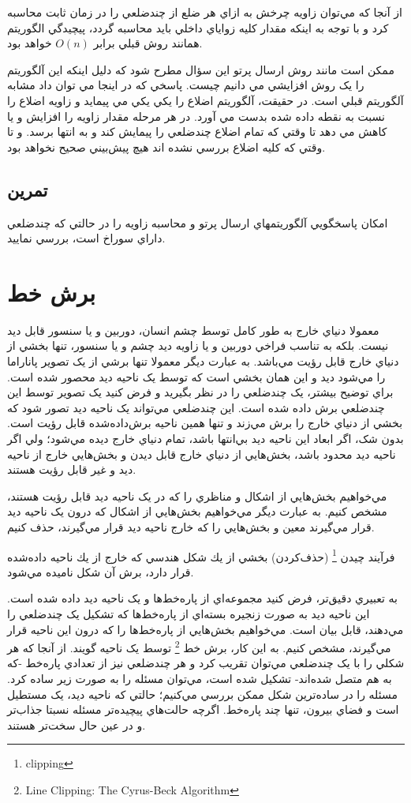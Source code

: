 \documentclass{book}
\begin{document}
از آنجا که مي‌توان زاويه چرخش به ازاي هر ضلع از چندضلعي را در زمان ثابت محاسبه کرد و با توجه به اينکه مقدار کليه زواياي داخلي بايد محاسبه گردد، پيچيدگي الگوريتم همانند روش قبلي برابر $O(n)$ خواهد بود.

ممکن است مانند روش ارسال پرتو اين سؤال مطرح شود که دليل اينکه اين آلگوريتم را يک روش افزايشي مي دانيم چيست. پاسخي که در اينجا مي توان داد مشابه آلگوريتم قبلي است. در حقيقت، آلگوريتم اضلاع را يکي يکي مي پيمايد و زاويه اضلاع را نسبت به نقطه داده شده بدست مي آورد. در هر مرحله مقدار زاويه را افزايش و يا کاهش مي دهد تا وقتي که تمام اضلاع چند‌ضلعي را پيمايش کند و به انتها برسد. و تا وقتي که کليه اضلاع بررسي نشده اند هيچ پيش‌بيني صحيح نخواهد بود.

\subsection{تمرين}

امکان پاسخگويي آلگوريتمهاي ارسال پرتو و محاسبه زاويه را در حالتي که چندضلعي داراي سوراخ است، بررسي نماييد.

\section{برش خط}

معمولا دنياي خارج به طور کامل توسط چشم انسان، دوربين و يا سنسور قابل ديد نيست. بلکه به تناسب فراخي دوربين و يا زاويه ديد چشم و يا سنسور، تنها بخشي از دنياي خارج قابل رؤيت مي‌باشد. به عبارت ديگر معمولا تنها برشي از يک تصوير پاناراما را مي‌شود ديد  و اين همان بخشي است که توسط يک ناحيه ديد محصور شده است. براي توضيح بيشتر،  يک چندضلعي را در نظر بگيريد و فرض کنيد يک تصوير توسط اين چندضلعي برش داده شده است. اين چندضلعي مي‌تواند يک ناحيه ديد تصور شود که بخشي از دنياي خارج را برش مي‌زند و تنها همين ناحيه برش‌داده‌شده قابل رؤيت است. بدون شک، اگر ابعاد اين ناحيه ديد بي‌انتها باشد، تمام دنياي خارج ديده مي‌شود؛ ولي اگر ناحيه ديد محدود باشد، بخش‌هايي از دنياي خارج قابل ديدن و بخش‌هايي خارج از ناحيه ديد و غير قابل رؤيت هستند.

مي‌خواهيم بخش‌هايي از اشکال و مناظري را که در يک ناحيه ديد قابل رؤيت هستند، مشخص کنيم. به عبارت ديگر مي‌خواهيم بخش‌هايي از اشکال که درون يک ناحيه ديد قرار مي‌گيرند معين و بخش‌هايي را که خارج ناحيه ديد قرار مي‌گيرند، حذف کنيم.

فرآيند چيدن \footnote{clipping}
(حذف‌كردن) بخشي از يك شکل هندسي كه خارج از يك ناحيه داده‌شده قرار دارد، برش آن شکل ناميده مي‌‌شود.

به تعبيري دقيق‌تر، فرض کنيد مجموعه‌اي از پاره‌خط‌ها و يک ناحيه ديد داده شده است. اين ناحيه ديد به‌ صورت زنجيره بسته‌اي از پاره‌خط‌ها که تشکيل يک چندضلعي را مي‌دهند، قابل بيان است. مي‌خواهيم بخش‌هايي از پاره‌خط‌ها را که درون اين ناحيه قرار مي‌گيرند، مشخص کنيم. به اين کار، برش خط \footnote{‌Line Clipping: The Cyrus-Beck Algorithm}
توسط يک ناحيه گويند.
از آنجا که هر شکلي را با يک چندضلعي مي‌توان تقريب کرد و هر چندضلعي نيز از تعدادي پاره‌خط -که به هم متصل شده‌اند- تشکيل شده است، مي‌توان مسئله را به صورت زير ساده کرد.
مسئله را در ساده‌ترين شکل ممکن بررسي مي‌کنيم؛ حالتي که ناحيه ديد، يک مستطيل است و فضاي بيرون، تنها چند پاره‌خط. اگرچه حالت‌هاي پيچيده‌تر مسئله نسبتا جذاب‌تر و در عين حال سخت‌تر هستند.
\end{document}
